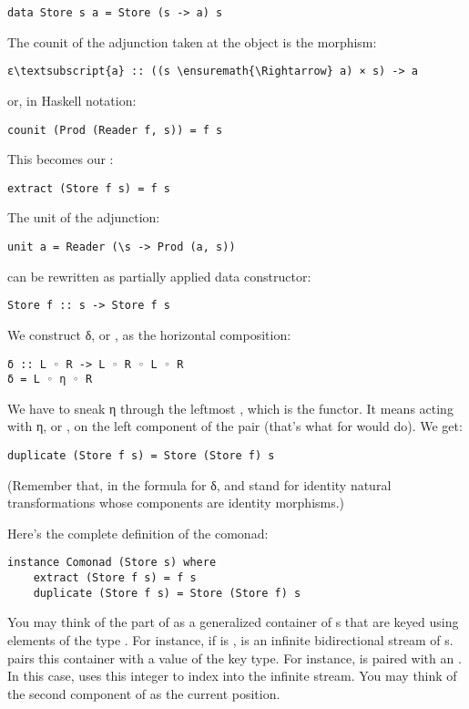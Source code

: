 \begin{verbatim}
data Store s a = Store (s -> a) s
\end{verbatim}
The counit of the adjunction taken at the object  is the
morphism:

\begin{Verbatim}[commandchars=\\\{\}]
ε\textsubscript{a} :: ((s \ensuremath{\Rightarrow} a) × s) -> a
\end{Verbatim}
or, in Haskell notation:

\begin{verbatim}
counit (Prod (Reader f, s)) = f s
\end{verbatim}
This becomes our :

\begin{verbatim}
extract (Store f s) = f s
\end{verbatim}
The unit of the adjunction:

\begin{verbatim}
unit a = Reader (\s -> Prod (a, s))
\end{verbatim}
can be rewritten as partially applied data constructor:

\begin{verbatim}
Store f :: s -> Store f s
\end{verbatim}
We construct δ, or , as the horizontal composition:

\begin{verbatim}
δ :: L ◦ R -> L ◦ R ◦ L ◦ R
δ = L ◦ η ◦ R
\end{verbatim}
We have to sneak η through the leftmost , which is the
 functor. It means acting with η, or , on
the left component of the pair (that's what  for
 would do). We get:

\begin{verbatim}
duplicate (Store f s) = Store (Store f) s
\end{verbatim}
(Remember that, in the formula for δ,  and  stand
for identity natural transformations whose components are identity
morphisms.)

Here's the complete definition of the  comonad:

\begin{verbatim}
instance Comonad (Store s) where
    extract (Store f s) = f s
    duplicate (Store f s) = Store (Store f) s
\end{verbatim}
You may think of the  part of  as a
generalized container of s that are keyed using elements of
the type . For instance, if  is ,
 is an infinite bidirectional stream of
s.  pairs this container with a value of the key
type. For instance,  is paired with an
. In this case,  uses this integer to index
into the infinite stream. You may think of the second component of
 as the current position.

